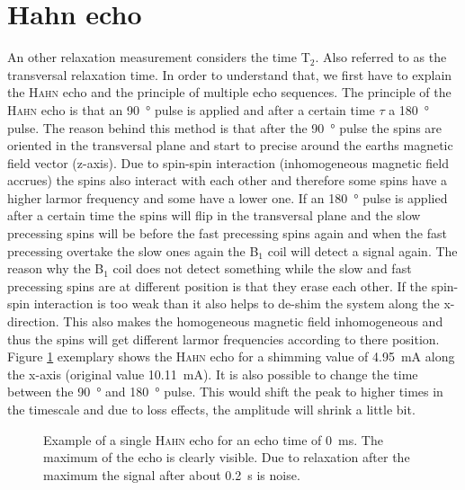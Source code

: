 \section{Hahn echo}
\label{sec:Hahnecho}
An other relaxation measurement considers the time T$_2$. Also referred to as the transversal relaxation time. In order to understand that, we first have to explain the \textsc{Hahn} echo and the principle of multiple echo sequences.\newline
The principle of the \textsc{Hahn} echo is that an \SI{90}{\degree} pulse is applied and after a certain time $\tau$ a \SI{180}{\degree} pulse. The reason behind this method is that after the \SI{90}{\degree} pulse the spins are oriented in the transversal plane and start to precise around the earths magnetic field vector (z-axis). Due to spin-spin interaction (inhomogeneous magnetic field accrues) the spins also interact with each other and therefore some spins have a higher larmor frequency and some have a lower one. If an \SI{180}{\degree} pulse is applied after a certain time the spins will flip in the transversal plane and the slow precessing spins will be before the fast precessing spins again and when the fast precessing  overtake the slow ones again the B$_1$ coil will detect a signal again. The reason why the B$_1$ coil does not detect something while the slow and fast precessing spins are at different position is that they erase each other. If the spin-spin interaction is too weak than it also helps to de-shim the system along the x-direction. This also makes the homogeneous magnetic field inhomogeneous and thus the spins will get different larmor frequencies according to there position.\newline
Figure \ref{fig:Echobeispeilsignal} exemplary shows the \textsc{Hahn} echo for a shimming value of \SI{4.95}{\milli \ampere} along the x-axis (original value \SI{10.11}{\milli \ampere}). It is also possible to change the time between the \SI{90}{\degree} and \SI{180}{\degree} pulse. This would shift the peak to higher times in the timescale and due to loss effects, the amplitude will shrink a little bit.
\begin{figure}[H]
    \centering
    
    \caption[Example of a single \textsc{Hahn} echo for an echo time of \SI{0}{\milli \second}.]{Example of a single \textsc{Hahn} echo for an echo time of \SI{0}{\milli \second}. The maximum of the echo is clearly visible. Due to relaxation after the maximum the signal after about \SI{0.2}{\second} is noise.}
    \label{fig:Echobeispeilsignal}
\end{figure}
